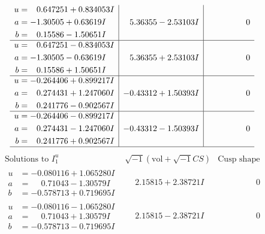 \documentclass[1p]{elsarticle_modified}
\theoremstyle{definition}
\newcommand{\I}{\sqrt{-1}}
\begin{document}
$$\begin{array}{c|c|c}
\begin{aligned}
u &= \phantom{-}0.647251 + 0.834053 I \\
a &= -1.30505 + 0.63619 I \\
b &= \phantom{-}0.15586 - 1.50651 I\end{aligned}
 & \phantom{-}5.36355 - 2.53103 I & \phantom{-0.000000 } 0 \\ \hline\begin{aligned}
u &= \phantom{-}0.647251 - 0.834053 I \\
a &= -1.30505 - 0.63619 I \\
b &= \phantom{-}0.15586 + 1.50651 I\end{aligned}
 & \phantom{-}5.36355 + 2.53103 I & \phantom{-0.000000 } 0 \\ \hline\begin{aligned}
u &= -0.264406 + 0.899217 I \\
a &= \phantom{-}0.274431 + 1.247060 I \\
b &= \phantom{-}0.241776 - 0.902567 I\end{aligned}
 & -0.43312 + 1.50393 I & \phantom{-0.000000 } 0 \\ \hline\begin{aligned}
u &= -0.264406 - 0.899217 I \\
a &= \phantom{-}0.274431 - 1.247060 I \\
b &= \phantom{-}0.241776 + 0.902567 I\end{aligned}
 & -0.43312 - 1.50393 I & \phantom{-0.000000 } 0\\
 \hline 
 \end{array}$$\newpage$$\begin{array}{c|c|c}  
\text{Solutions to }I^u_{1}& \I (\text{vol} + \sqrt{-1}CS) & \text{Cusp shape}\\
 \hline 
\begin{aligned}
u &= -0.080116 + 1.065280 I \\
a &= \phantom{-}0.71043 - 1.30579 I \\
b &= -0.578713 + 0.719695 I\end{aligned}
 & \phantom{-}2.15815 + 2.38721 I & \phantom{-0.000000 } 0 \\ \hline\begin{aligned}
u &= -0.080116 - 1.065280 I \\
a &= \phantom{-}0.71043 + 1.30579 I \\
b &= -0.578713 - 0.719695 I\end{aligned}
 & \phantom{-}2.15815 - 2.38721 I & \phantom{-0.000000 } 0 \\ \hline\begin{aligned}

\end{aligned}
\end{array}$$
\end{document}

